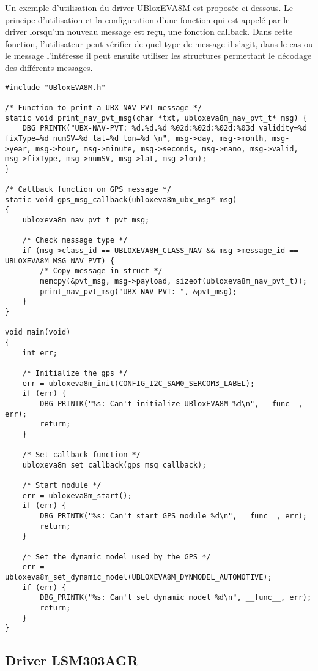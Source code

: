 Un exemple d'utilisation du driver UBloxEVA8M est proposée ci-dessous. Le principe d'utilisation et la configuration d'une fonction qui est appelé par le driver lorsqu'un nouveau message est reçu, une fonction callback. Dans cette fonction, l'utilisateur peut vérifier de quel type de message il s'agit, dans le cas ou le message l'intéresse il peut ensuite utiliser les structures permettant le décodage des différents messages.

\begin{lstlisting}[style=CStyle]
#include "UBloxEVA8M.h"

/* Function to print a UBX-NAV-PVT message */
static void print_nav_pvt_msg(char *txt, ubloxeva8m_nav_pvt_t* msg) {
	DBG_PRINTK("UBX-NAV-PVT: %d.%d.%d %02d:%02d:%02d:%03d validity=%d fixType=%d numSV=%d lat=%d lon=%d \n", msg->day, msg->month, msg->year, msg->hour, msg->minute, msg->seconds, msg->nano, msg->valid, msg->fixType, msg->numSV, msg->lat, msg->lon);
}

/* Callback function on GPS message */
static void gps_msg_callback(ubloxeva8m_ubx_msg* msg)
{
	ubloxeva8m_nav_pvt_t pvt_msg;
	
	/* Check message type */
	if (msg->class_id == UBLOXEVA8M_CLASS_NAV && msg->message_id == UBLOXEVA8M_MSG_NAV_PVT) {
		/* Copy message in struct */
		memcpy(&pvt_msg, msg->payload, sizeof(ubloxeva8m_nav_pvt_t));
		print_nav_pvt_msg("UBX-NAV-PVT: ", &pvt_msg);
	}
}

void main(void)
{
	int err;

	/* Initialize the gps */
	err = ubloxeva8m_init(CONFIG_I2C_SAM0_SERCOM3_LABEL);
	if (err) {
		DBG_PRINTK("%s: Can't initialize UBloxEVA8M %d\n", __func__, err);
		return;
	}

	/* Set callback function */
	ubloxeva8m_set_callback(gps_msg_callback);

	/* Start module */
	err = ubloxeva8m_start();
	if (err) {
		DBG_PRINTK("%s: Can't start GPS module %d\n", __func__, err);
		return;
	}

	/* Set the dynamic model used by the GPS */
	err = ubloxeva8m_set_dynamic_model(UBLOXEVA8M_DYNMODEL_AUTOMOTIVE);
	if (err) {
		DBG_PRINTK("%s: Can't set dynamic model %d\n", __func__, err);
		return;
	}
}
\end{lstlisting}

\subsection{Driver LSM303AGR}

